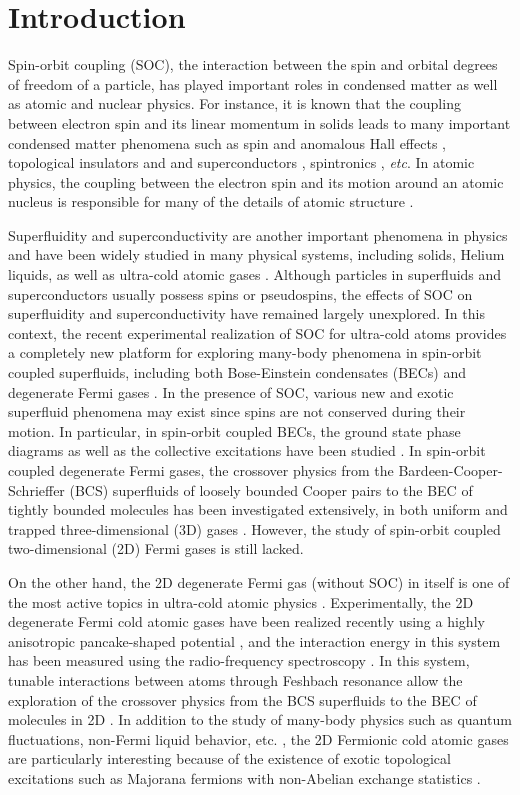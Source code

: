 \documentclass[pra,print,showpacs,superscriptaddress,twocolumn]{revtex4}
\begin{document}
\section{Introduction}

Spin-orbit coupling (SOC), the interaction between the spin and orbital
degrees of freedom of a particle, has played important roles in condensed
matter as well as atomic and nuclear physics. For instance, it is known that
the coupling between electron spin and its linear momentum in solids leads
to many important condensed matter phenomena such as spin and anomalous Hall
effects \cite{NN,DX}, topological insulators and and superconductors \cite%
{Qi}, spintronics \cite{Zutic}, \textit{etc}. In atomic physics, the
coupling between the electron spin and its motion around an atomic nucleus
is responsible for many of the details of atomic structure \cite{Fine}.

Superfluidity and superconductivity are another important phenomena in
physics and have been widely studied in many physical systems, including
solids, Helium liquids, as well as ultra-cold atomic gases \cite{Leggett}.
Although particles in superfluids and superconductors usually possess spins
or pseudospins, the effects of SOC on superfluidity and superconductivity
have remained largely unexplored. In this context, the recent experimental
realization of SOC for ultra-cold atoms \cite{LYJ1} provides a completely
new platform for exploring many-body phenomena in spin-orbit coupled
superfluids, including both Bose-Einstein condensates (BECs) \cite%
{Zhai,allbose} and degenerate Fermi gases \cite{3DF,LD}. In the presence of
SOC, various new and exotic superfluid phenomena may exist since spins are
not conserved during their motion. In particular, in spin-orbit coupled
BECs, the ground state phase diagrams as well as the collective excitations
have been studied \cite{Zhai}. In spin-orbit coupled degenerate Fermi gases,
the crossover physics from the Bardeen-Cooper-Schrieffer (BCS) superfluids
of loosely bounded Cooper pairs to the BEC of tightly bounded molecules has
been investigated extensively, in both uniform and trapped three-dimensional
(3D) gases \cite{3DF,LD}. However, the study of spin-orbit coupled
two-dimensional (2D) Fermi gases is still lacked.

On the other hand, the 2D degenerate Fermi gas (without SOC) in itself is
one of the most active topics in ultra-cold atomic physics \cite{2DF}.
Experimentally, the 2D degenerate Fermi cold atomic gases have been realized
recently using a highly anisotropic pancake-shaped potential \cite%
{Martiyanov}, and the interaction energy in this system has been measured
using the radio-frequency spectroscopy \cite{BF}. In this system, tunable
interactions between atoms through Feshbach resonance \cite{FR} allow the
exploration of the crossover physics from the BCS superfluids to the BEC of
molecules in 2D \cite{MR}. In addition to the study of many-body physics
such as quantum fluctuations, non-Fermi liquid behavior, etc. \cite{Sachdev}%
, the 2D Fermionic cold atomic gases are particularly interesting because of
the existence of exotic topological excitations such as Majorana fermions
with non-Abelian exchange statistics \cite{Zhang}.
\end{document}
